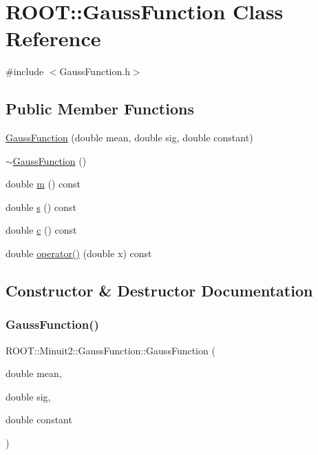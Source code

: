 \hypertarget{classROOT_1_1Minuit2_1_1GaussFunction}{}\section{R\+O\+OT\+:\+:Gauss\+Function Class Reference}
\label{classROOT_1_1Minuit2_1_1GaussFunction}


{\ttfamily \#include $<$Gauss\+Function.\+h$>$}

\subsection*{Public Member Functions}
\begin{DoxyCompactItemize}
\item 
\mbox{\hyperlink{classROOT_1_1Minuit2_1_1GaussFunction_acb3c7452d1b01833561dff721ab6e503}{Gauss\+Function}} (double mean, double sig, double constant)
\item 
\mbox{\hyperlink{classROOT_1_1Minuit2_1_1GaussFunction_a9d1701423a091b236c0bcb71bff16eac}{$\sim$\+Gauss\+Function}} ()
\item 
double \mbox{\hyperlink{classROOT_1_1Minuit2_1_1GaussFunction_a746dc27d10faf57599e9a0a5bc232a1d}{m}} () const
\item 
double \mbox{\hyperlink{classROOT_1_1Minuit2_1_1GaussFunction_aae78103bd6daf029fdb95d70185803e2}{s}} () const
\item 
double \mbox{\hyperlink{classROOT_1_1Minuit2_1_1GaussFunction_a47a6fa37ae77d53b45da55353094c79e}{c}} () const
\item 
double \mbox{\hyperlink{classROOT_1_1Minuit2_1_1GaussFunction_a5fe07f3350b17d79583af7b844ded399}{operator()}} (double x) const
\end{DoxyCompactItemize}


\subsection{Constructor \& Destructor Documentation}
\mbox{\label{classROOT_1_1Minuit2_1_1GaussFunction_acb3c7452d1b01833561dff721ab6e503}} 
\subsubsection{\texorpdfstring{GaussFunction()}{GaussFunction()}}
{\footnotesize\ttfamily R\+O\+O\+T\+::\+Minuit2\+::\+Gauss\+Function\+::\+Gauss\+Function (\begin{DoxyParamCaption}\item[{double}]{mean,  }\item[{double}]{sig,  }\item[{double}]{constant }\end{DoxyParamCaption})\hspace{0.3cm}{\ttfamily [inline]}}


